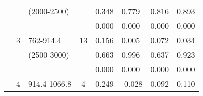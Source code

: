\begin{table}[p]
\begin{tabular}{cclcllll}
                                                               &                                                                 & (2000-2500)                                                           &                                                                        & 0.348                                       & 0.779                                           & 0.816                                              & 0.893  \\ 
                                                               &                                                                 &                                                                                &                                                                        &  0.000                                      & 0.000                                           & 0.000                                              & 0.000  \\ \cline{5-8}\noalign{\smallskip}
                                                               &  3                                                             & 762-914.4                                                              & 13                                                                   &  0.156                                      & 0.005                                           & 0.072                                              & 0.034  \\ 
                                                               &                                                                 & (2500-3000)                                                           &                                                                        &  0.663                                      & 0.996                                           & 0.637                                              & 0.923  \\ 
                                                               &                                                                 &                                                                                &                                                                        & 0.000                                       & 0.000                                           & 0.000                                               & 0.000  \\ \cline{5-8}\noalign{\smallskip}
                                                               & 4                                                              &  914.4-1066.8                                                        & 4                                                                     &  0.249                                      & -0.028                                          & 0.092                                               & 0.110  \\ 

\end{tabular}
\end{table}
